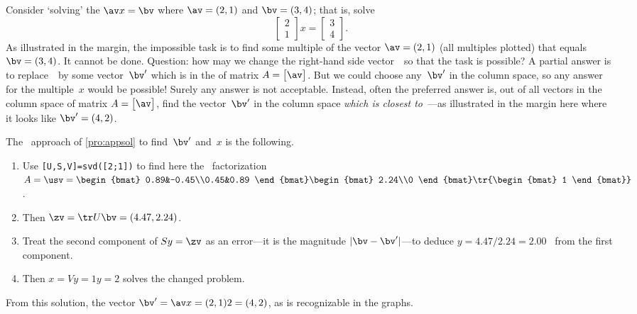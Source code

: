 \begin{example} \label{eg:incon1}
Consider `solving' the  \(\av x=\bv\) where \(\av=(2,1)\) and \(\bv=(3,4)\); that is, solve
\begin{equation*}
\begin{bmatrix} 2\\1 \end{bmatrix}x=\begin{bmatrix} 3\\4 \end{bmatrix}.
\end{equation*}
%
As illustrated in the margin, the impossible task is to find some multiple of the vector \(\av=(2,1)\) (all multiples plotted) that equals \(\bv=(3,4)\).
It cannot be done.
Question: how may we change the right-hand side vector~\bv\ so that the task is possible?  
A partial answer is to replace~\bv\ by some vector~\(\bv'\) which is in the  of matrix \(A=\begin{bmatrix} \av \end{bmatrix}\).
But we could choose any~\(\bv'\) in the column space, so any answer for the multiple~\(x\) would be possible! Surely any answer is not acceptable.
%
Instead, often the preferred answer is, out of all vectors in the column space of matrix \(A=\begin{bmatrix} \av \end{bmatrix}\),  find the vector~\(\bv'\) in the column space \emph{which is closest to}~\bv---as illustrated in the margin here where it looks like \(\bv'=(4,2)\).

The \svd\ approach of \cref{pro:appsol} to find~\(\bv'\) and~\(x\) is the following.
\begin{enumerate}
\item Use \verb|[U,S,V]=svd([2;1])| to find here the \svd\ factorization \(A=\usv=\begin{bmat} 0.89&-0.45\\0.45&0.89 \end{bmat} \begin{bmat} 2.24\\0 \end{bmat}\tr{\begin{bmat} 1 \end{bmat}}\) \twodp.
\item Then \(\zv=\tr U\bv=(4.47,2.24)\).
\item Treat the second component of \(Sy=\zv\) as an error---it is the magnitude \(|\bv-\bv'|\)---to deduce \(y=4.47/2.24=2.00\) \twodp\ from the first component.
\item Then  \(x=Vy=1y=2\) solves the changed problem.
\end{enumerate}
From this solution, the vector \(\bv'=\av x=(2,1)2=(4,2)\), as is recognizable in the graphs.
\end{example}

